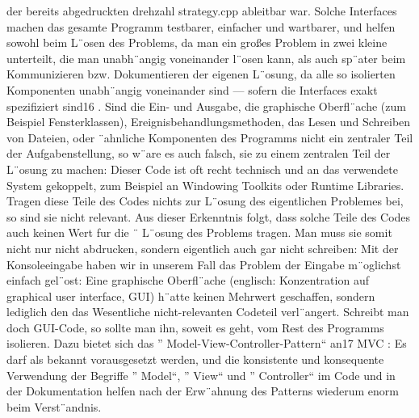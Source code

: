 \documentclass[a4paper,10pt,ngerman]{scrartcl}
\begin{document}
    der bereits abgedruckten drehzahl strategy.cpp ableitbar war.
    Solche Interfaces machen
    das gesamte Programm testbarer, einfacher und wartbarer, und helfen sowohl beim L¨osen
    des Problems, da man ein großes Problem in zwei kleine unterteilt, die man unabh¨angig
    voneinander l¨osen kann, als auch sp¨ater beim Kommunizieren bzw.
    Dokumentieren der
    eigenen L¨osung, da alle so isolierten Komponenten unabh¨angig voneinander sind —
    sofern die Interfaces exakt spezifiziert sind16
    .
    Sind die Ein- und Ausgabe, die graphische Oberfl¨ache (zum Beispiel Fensterklassen),
    Ereignisbehandlungsmethoden, das Lesen und Schreiben von Dateien, oder ¨ahnliche
    Komponenten des Programms nicht ein zentraler Teil der Aufgabenstellung, so w¨are
    es auch falsch, sie zu einem zentralen Teil der L¨osung zu machen: Dieser Code ist oft
    recht technisch und an das verwendete System gekoppelt, zum Beispiel an Windowing
    Toolkits oder Runtime Libraries. Tragen diese Teile des Codes nichts zur L¨osung des
    eigentlichen Problemes bei, so sind sie nicht relevant.
    Aus dieser Erkenntnis folgt, dass solche Teile des Codes auch keinen Wert fur die ¨
    L¨osung des Problems tragen. Man muss sie somit nicht nur nicht abdrucken, sondern
    eigentlich auch gar nicht schreiben: Mit der Konsoleeingabe haben wir in unserem Fall
    das Problem der Eingabe m¨oglichst einfach gel¨ost: Eine graphische Oberfl¨ache (englisch:
    Konzentration auf graphical user interface, GUI) h¨atte keinen Mehrwert geschaffen, sondern lediglich den
    das Wesentliche nicht-relevanten Codeteil verl¨angert.
    Schreibt man doch GUI-Code, so sollte man ihn, soweit es geht, vom Rest des Programms isolieren.
    Dazu bietet sich das ”
    Model-View-Controller-Pattern“ an17 MVC : Es darf
    als bekannt vorausgesetzt werden, und die konsistente und konsequente Verwendung der
    Begriffe ”
    Model“, ”
    View“ und ”
    Controller“ im Code und in der Dokumentation helfen
    nach der Erw¨ahnung des Patterns wiederum enorm beim Verst¨andnis.
\end{document}
